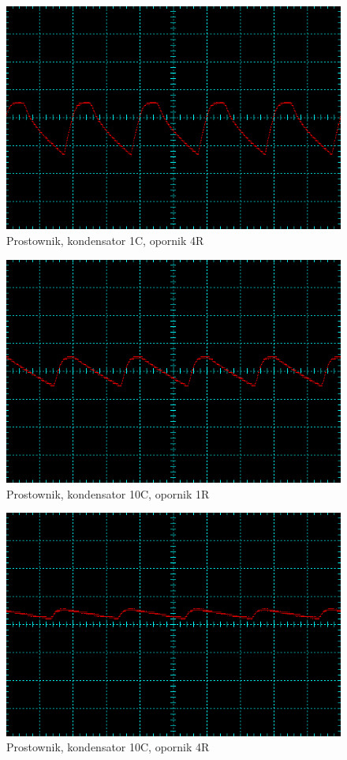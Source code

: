 \documentclass[a4paper,11pt]{article}
\begin{document}
\begin{figure}[ht]
 \begin{center}
  \includegraphics[width=12cm]{prostownik_1C_4R}
 \end{center}
 \caption{Prostownik, kondensator 1C, opornik 4R}
\end{figure}

\begin{figure}[ht]
 \begin{center}
  \includegraphics[width=12cm]{prostownik_10C_1R}
 \end{center}
 \caption{Prostownik, kondensator 10C, opornik 1R}
\end{figure}

\begin{figure}[ht]
 \begin{center}
  \includegraphics[width=12cm]{prostownik_10C_4R}
 \end{center}
 \caption{Prostownik, kondensator 10C, opornik 4R}
\end{figure}
\end{document}
